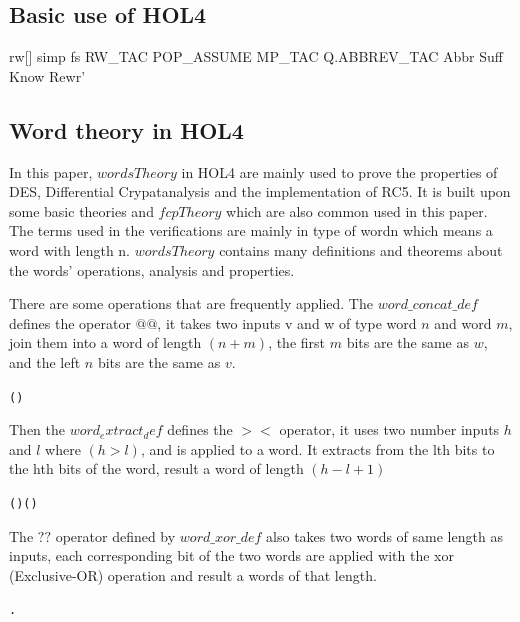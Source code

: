 \documentclass{article}
\begin{document}
\subsection{Basic use of HOL4}
rw[] simp fs
RW_TAC
POP_ASSUME MP_TAC
Q.ABBREV_TAC Abbr
Suff Know Rewr'

\subsection{Word theory in HOL4}
In this paper, $wordsTheory$ in HOL4 are mainly used to prove the properties of DES, Differential Crypatanalysis
and the implementation of RC5. It is built upon some basic theories and $fcpTheory$ which are also common used in
this paper. The terms used in the verifications are mainly in type of wordn which means a word with length n.
$wordsTheory$ contains many definitions and theorems about the words' operations, analysis and properties.

There are some operations that are frequently applied. The $word\_concat\_def$ defines the operator $@@$, it takes two
inputs v and w of type word $n$ and word $m$, join them into a word of length $(n+m)$, the first $m$ bits are the same as $w$,
and the left $n$ bits are the same as $v$.
\begin{alltt}
   \HOLTokenTurnstile{}    \HOLSymConst{=}  (  )
\end{alltt}

Then the $word_extract_def$ defines the $><$ operator, it uses two number inputs $h$ and $l$ where $(h>l)$, and is applied
to a word. It extracts from the lth bits to the hth bits of the word, result a word of length $(h-l+1)$
\begin{alltt}
   \HOLTokenTurnstile{} ( \HOLSymConst{\HOLTokenExtract{}} ) \HOLSymConst{=}  \HOLSymConst{\HOLTokenCompose} ( \HOLSymConst{--} )
\end{alltt}

The $??$ operator defined by $word\_xor\_def$ also takes two words of same length as inputs,
each corresponding bit of the two words are applied with the xor (Exclusive-OR) operation
and result a words of that length.
\begin{alltt}
   \HOLTokenTurnstile{}  \HOLSymConst{\HOLTokenEor{}}  \HOLSymConst{=}  .    \HOLSymConst{\HOLTokenNotEquiv{}}   
\end{alltt}
\end{document}
